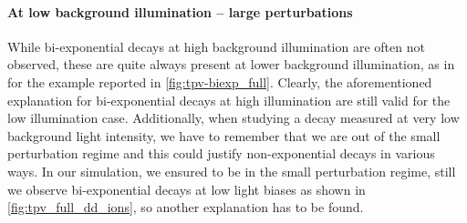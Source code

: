 		\paragraph{At low background illumination -- large perturbations}
		While bi\hyp{}exponential decays at high background illumination are often not observed, these are quite always present at lower background illumination, as in for the example reported in \cref{fig:tpv-biexp_full}.
		Clearly, the aforementioned explanation for bi\hyp{}exponential decays at high illumination are still valid for the low illumination case.
		Additionally, when studying a decay measured at very low background light intensity, we have to remember that we are out of the small perturbation regime and this could justify non\hyp{}exponential decays in various ways.
		In our simulation, we ensured to be in the small perturbation regime, still we observe bi\hyp{}exponential decays at low light biases as shown in \cref{fig:tpv_full_dd_ions}, so another explanation has to be found.

